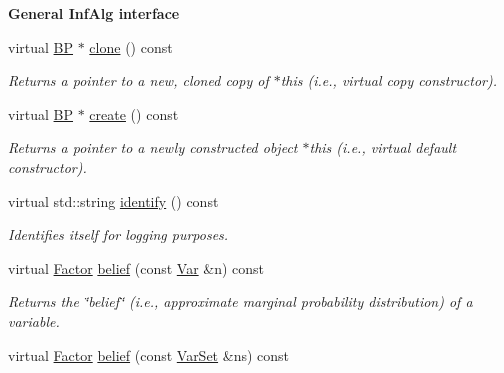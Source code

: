 \begin{Indent}{\bf General InfAlg interface}\par
\begin{CompactItemize}
\item 
\hypertarget{classdai_1_1BP_fedbd91bf39951ac3efca096183d6b48}{
virtual \hyperlink{classdai_1_1BP}{BP} $\ast$ \hyperlink{classdai_1_1BP_fedbd91bf39951ac3efca096183d6b48}{clone} () const }
\label{classdai_1_1BP_fedbd91bf39951ac3efca096183d6b48}

\begin{CompactList}\small\item\em Returns a pointer to a new, cloned copy of $\ast$this (i.e., virtual copy constructor). \item\end{CompactList}\item 
\hypertarget{classdai_1_1BP_43d048b5417b74f94eca669eca5eead4}{
virtual \hyperlink{classdai_1_1BP}{BP} $\ast$ \hyperlink{classdai_1_1BP_43d048b5417b74f94eca669eca5eead4}{create} () const }
\label{classdai_1_1BP_43d048b5417b74f94eca669eca5eead4}

\begin{CompactList}\small\item\em Returns a pointer to a newly constructed object $\ast$this (i.e., virtual default constructor). \item\end{CompactList}\item 
\hypertarget{classdai_1_1BP_79d6acb552bc11638fe46dc5a6f68c4d}{
virtual std::string \hyperlink{classdai_1_1BP_79d6acb552bc11638fe46dc5a6f68c4d}{identify} () const }
\label{classdai_1_1BP_79d6acb552bc11638fe46dc5a6f68c4d}

\begin{CompactList}\small\item\em Identifies itself for logging purposes. \item\end{CompactList}\item 
\hypertarget{classdai_1_1BP_1ff12f6f4b486bd53a46a12f7956c99c}{
virtual \hyperlink{classdai_1_1TFactor}{Factor} \hyperlink{classdai_1_1BP_1ff12f6f4b486bd53a46a12f7956c99c}{belief} (const \hyperlink{classdai_1_1Var}{Var} \&n) const }
\label{classdai_1_1BP_1ff12f6f4b486bd53a46a12f7956c99c}

\begin{CompactList}\small\item\em Returns the \char`\"{}belief\char`\"{} (i.e., approximate marginal probability distribution) of a variable. \item\end{CompactList}\item 
\hypertarget{classdai_1_1BP_a898556d97635bfba7227dfa9c0fbdfc}{
virtual \hyperlink{classdai_1_1TFactor}{Factor} \hyperlink{classdai_1_1BP_a898556d97635bfba7227dfa9c0fbdfc}{belief} (const \hyperlink{classdai_1_1VarSet}{VarSet} \&ns) const }
\label{classdai_1_1BP_a898556d97635bfba7227dfa9c0fbdfc}


\end{CompactItemize}
\end{Indent}
